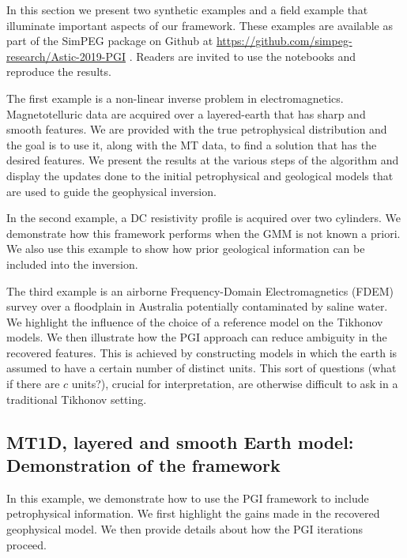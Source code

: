 \documentclass[extra]{gji} %
\begin{document}
In this section we present two synthetic examples and a field example that illuminate important aspects of our framework. These examples are available as part of the SimPEG package on Github at \url{https://github.com/simpeg-research/Astic-2019-PGI} \citep{PGIexamples}. Readers are invited to use the notebooks and reproduce the results.

The first example is a non-linear inverse problem in electromagnetics. Magnetotelluric data \citep{WardandHohmann} are acquired over a layered-earth that has sharp and smooth features. We are provided with the true petrophysical distribution and the goal is to use it, along with the MT data, to find a solution that has the desired features. We present the results at the various steps of the algorithm and display the updates done to the initial petrophysical and geological models that are used to guide the geophysical inversion.

In the second example, a DC resistivity profile \citep{WardandHohmann} is acquired over two cylinders. We demonstrate how this framework performs when the GMM is not known a priori. We also use this example to show how prior geological information can be included into the inversion.

The third example is an airborne Frequency-Domain Electromagnetics (FDEM) survey \citep{WardandHohmann} over a floodplain in Australia potentially contaminated by saline water. We highlight the influence of the choice of a reference model on the Tikhonov models. We then illustrate how the PGI approach can reduce ambiguity in the recovered features. This is achieved by constructing models in which the earth is assumed to have a certain number of distinct units. This sort of questions (what if there are $c$ units?), crucial for interpretation, are otherwise difficult to ask in a traditional Tikhonov setting.

\subsection{MT1D, layered and smooth Earth model: Demonstration of the framework}

In this example, we demonstrate how to use the PGI framework to include petrophysical information. We first highlight the gains made in the recovered geophysical model. We then provide details about how the PGI iterations proceed.
\end{document}
